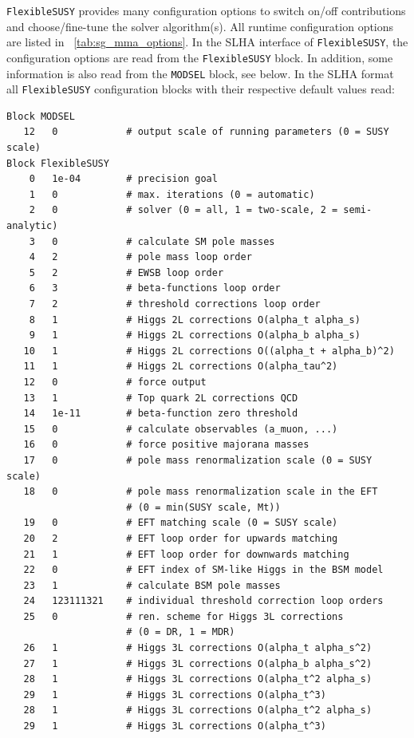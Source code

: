 \documentclass[final,3p,11pt,pdflatex]{elsarticle}
\makeatletter
\newcommand{\fs}{\texttt{FlexibleSUSY}\@\xspace}
\newcommand{\tabref}[1]{\tablename~\ref{#1}}
\makeatother
\begin{document}
\fs provides many configuration options to switch on/off contributions
and choose/fine-tune the solver algorithm(s).  All runtime
configuration options are listed in \tabref{tab:sg_mma_options}.
%
In the SLHA interface of \fs, the configuration options are read from
the \fs block.  In addition, some information is also read
from the \texttt{MODSEL} block, see below.  In the SLHA format all \fs
configuration blocks with their respective default values read:
%
\begin{lstlisting}
Block MODSEL
   12   0            # output scale of running parameters (0 = SUSY scale)
Block FlexibleSUSY
    0   1e-04        # precision goal
    1   0            # max. iterations (0 = automatic)
    2   0            # solver (0 = all, 1 = two-scale, 2 = semi-analytic)
    3   0            # calculate SM pole masses
    4   2            # pole mass loop order
    5   2            # EWSB loop order
    6   3            # beta-functions loop order
    7   2            # threshold corrections loop order
    8   1            # Higgs 2L corrections O(alpha_t alpha_s)
    9   1            # Higgs 2L corrections O(alpha_b alpha_s)
   10   1            # Higgs 2L corrections O((alpha_t + alpha_b)^2)
   11   1            # Higgs 2L corrections O(alpha_tau^2)
   12   0            # force output
   13   1            # Top quark 2L corrections QCD
   14   1e-11        # beta-function zero threshold
   15   0            # calculate observables (a_muon, ...)
   16   0            # force positive majorana masses
   17   0            # pole mass renormalization scale (0 = SUSY scale)
   18   0            # pole mass renormalization scale in the EFT
                     # (0 = min(SUSY scale, Mt))
   19   0            # EFT matching scale (0 = SUSY scale)
   20   2            # EFT loop order for upwards matching
   21   1            # EFT loop order for downwards matching
   22   0            # EFT index of SM-like Higgs in the BSM model
   23   1            # calculate BSM pole masses
   24   123111321    # individual threshold correction loop orders
   25   0            # ren. scheme for Higgs 3L corrections
                     # (0 = DR, 1 = MDR)
   26   1            # Higgs 3L corrections O(alpha_t alpha_s^2)
   27   1            # Higgs 3L corrections O(alpha_b alpha_s^2)
   28   1            # Higgs 3L corrections O(alpha_t^2 alpha_s)
   29   1            # Higgs 3L corrections O(alpha_t^3)
   28   1            # Higgs 3L corrections O(alpha_t^2 alpha_s)
   29   1            # Higgs 3L corrections O(alpha_t^3)
\end{lstlisting}
\end{document}
